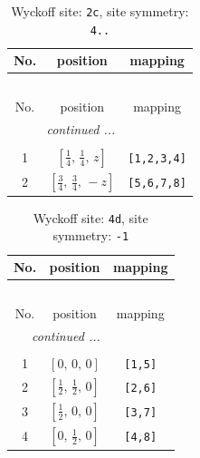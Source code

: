 \documentclass[fleqn,8pt]{jsarticle}
\begin{document}
\renewcommand{\arraystretch}{1.2}
\begin{longtable}{ccc}
\caption{Wyckoff site: {\tt 2c}, site symmetry: {\tt 4..}}
 \\
 \hline \hline
No. & position & mapping \\ \hline \endfirsthead

\multicolumn{2}{l}{\tablename\ \thetable{}} \\
 \hline \hline
No. & position & mapping \\ \hline \endhead

 \hline \hline
\multicolumn{2}{r}{\footnotesize\it continued ...} \\ \endfoot

 \hline \hline
\multicolumn{2}{r}{} \\ \endlastfoot

1 & $\left[ \frac{1}{4},\, \frac{1}{4},\, z \right]$ & {\tt [1,2,3,4]} \\ \hline
2 & $\left[ \frac{3}{4},\, \frac{3}{4},\, - z \right]$ & {\tt [5,6,7,8]} \\
\end{longtable}
\renewcommand{\arraystretch}{1.2}
\begin{longtable}{ccc}
\caption{Wyckoff site: {\tt 4d}, site symmetry: {\tt -1}}
 \\
 \hline \hline
No. & position & mapping \\ \hline \endfirsthead

\multicolumn{2}{l}{\tablename\ \thetable{}} \\
 \hline \hline
No. & position & mapping \\ \hline \endhead

 \hline \hline
\multicolumn{2}{r}{\footnotesize\it continued ...} \\ \endfoot

 \hline \hline
\multicolumn{2}{r}{} \\ \endlastfoot

1 & $\left[ 0,\, 0,\, 0 \right]$ & {\tt [1,5]} \\ \hline
2 & $\left[ \frac{1}{2},\, \frac{1}{2},\, 0 \right]$ & {\tt [2,6]} \\ \hline
3 & $\left[ \frac{1}{2},\, 0,\, 0 \right]$ & {\tt [3,7]} \\ \hline
4 & $\left[ 0,\, \frac{1}{2},\, 0 \right]$ & {\tt [4,8]} \\
\end{longtable}
\renewcommand{\arraystretch}{1.2}
\end{document}
